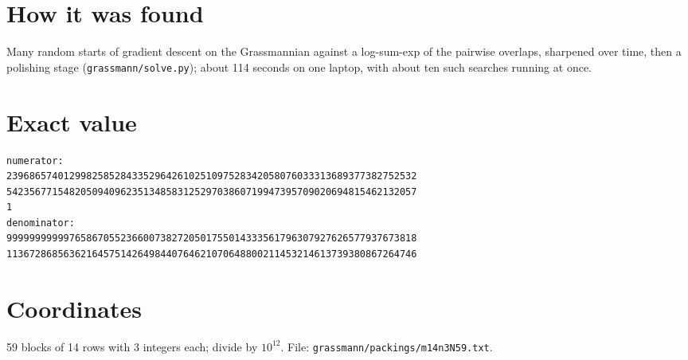 \documentclass[11pt,a4paper]{article}
\begin{document}
\section{How it was found}
Many random starts of gradient descent on the Grassmannian against a log-sum-exp of the pairwise overlaps, sharpened over time, then a polishing stage (\texttt{grassmann/solve.py}); about 114 seconds on one laptop, with about ten such searches running at once.


\appendix
\section{Exact value}
{\small
\begin{verbatim}
numerator:
239686574012998258528433529642610251097528342058076033313689377382752532
542356771548205094096235134858312529703860719947395709020694815462132057
1
denominator:
999999999997658670552366007382720501755014333561796307927626577937673818
113672868563621645751426498440764621070648800211453214613739380867264746
\end{verbatim}}

\section{Coordinates}
59 blocks of 14 rows with 3 integers each; divide by $10^{12}$. File: \texttt{grassmann/packings/m14n3N59.txt}.
{\tiny
\begin{multicols}{3}
\end{multicols}}
\end{document}

